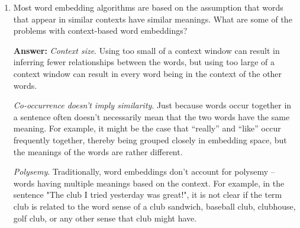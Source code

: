 \documentclass{article}
\newenvironment{QandA}{\begin{enumerate}[label=\arabic*.]}{\end{enumerate}}
\newenvironment{InnerQandA}{\begin{enumerate}[label=\roman*.]}{\end{enumerate}}
\newenvironment{answer}{\par\normalfont \textbf{Answer:}}{}
\begin{document}
\begin{QandA}
\begin{InnerQandA}
        \item Most word embedding algorithms are based on the assumption that words that appear in similar contexts have similar meanings. What are some of the problems with context-based word embeddings?
        \begin{answer}
            \textit{Context size}. Using too small of a context window can result in inferring fewer relationships between the words, but using too large of a context window can result in every word being in the context of the other words. 

            \textit{Co-occurrence doesn't imply similarity}. Just because words occur together in a sentence often doesn't necessarily mean that the two words have the same meaning. For example, it might be the case that ``really'' and ``like'' occur frequently together, thereby being grouped closely in embedding space, but the meanings of the words are rather different. 

            \textit{Polysemy}. Traditionally, word embeddings don't account for polysemy -- words having multiple meanings based on the context. For example, in the sentence "The club I tried yesterday was great!", it is not clear if the term club is related to the word sense of a club sandwich, baseball club, clubhouse, golf club, or any other sense that club might have. 
        \end{answer}
    \end{InnerQandA}


\end{QandA}
\end{document}
